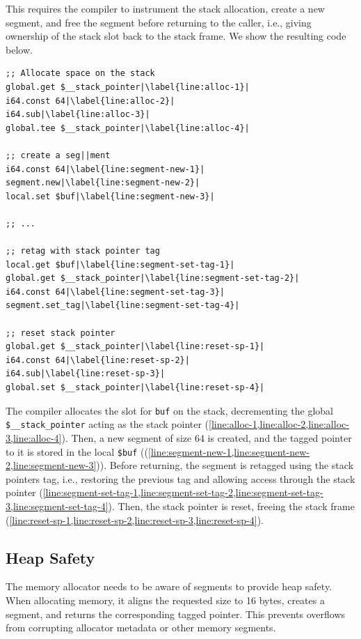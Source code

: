 This requires the compiler to instrument the stack allocation, create a new segment, and free the segment before returning to the caller, i.e., giving ownership of the stack slot back to the stack frame.
We show the resulting code below.

\begin{lstlisting}[frame=h,style=customwasm,
    label={lst:wasm-example},escapechar=|]
;; Allocate space on the stack
global.get $__stack_pointer|\label{line:alloc-1}|
i64.const 64|\label{line:alloc-2}|
i64.sub|\label{line:alloc-3}|
global.tee $__stack_pointer|\label{line:alloc-4}|

;; create a seg||ment
i64.const 64|\label{line:segment-new-1}|
segment.new|\label{line:segment-new-2}|
local.set $buf|\label{line:segment-new-3}|

;; ...

;; retag with stack pointer tag
local.get $buf|\label{line:segment-set-tag-1}|
global.get $__stack_pointer|\label{line:segment-set-tag-2}|
i64.const 64|\label{line:segment-set-tag-3}|
segment.set_tag|\label{line:segment-set-tag-4}|

;; reset stack pointer
global.get $__stack_pointer|\label{line:reset-sp-1}|
i64.const 64|\label{line:reset-sp-2}|
i64.sub|\label{line:reset-sp-3}|
global.set $__stack_pointer|\label{line:reset-sp-4}|
\end{lstlisting}

The compiler allocates the slot for \texttt{buf} on the stack, decrementing the global \texttt{\$\_\_stack\_pointer} acting as the stack pointer (\cref{line:alloc-1,line:alloc-2,line:alloc-3,line:alloc-4}).
Then, a new segment of size 64 is created, and the tagged pointer to it is stored in the local \lstinline[style=customwasm]{$buf} ((\cref{line:segment-new-1,line:segment-new-2,line:segment-new-3})).
Before returning, the segment is retagged using the stack pointers tag, i.e., restoring the previous tag and allowing access through the stack pointer (\cref{line:segment-set-tag-1,line:segment-set-tag-2,line:segment-set-tag-3,line:segment-set-tag-4}).
Then, the stack pointer is reset, freeing the stack frame (\cref{line:reset-sp-1,line:reset-sp-2,line:reset-sp-3,line:reset-sp-4}).

\subsection{Heap Safety}
\label{subsec:heap-safety}

The memory allocator needs to be aware of segments to provide heap safety.
When allocating memory, it aligns the requested size to 16 bytes, creates a segment, and returns the corresponding tagged pointer.
This prevents overflows from corrupting allocator metadata or other memory segments.

